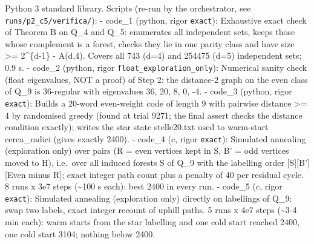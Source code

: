 Python 3 standard library. Scripts (re-run by the orchestrator, see
\texttt{runs/p2\_c5/verifica/}): - code\_1 (python, rigor
\texttt{exact}): Exhaustive exact check of Theorem B on Q\_4 and Q\_5:
enumerates all independent sets, keeps those whose complement is a
forest, checks they lie in one parity class and have size \textgreater=
2\^{}\{d-1\} - A(d,4). Covers all 743 (d=4) and 254475 (d=5) independent
sets; 0.9 s. - code\_2 (python, rigor
\texttt{float\_exploration\_only}): Numerical sanity check (float
eigenvalues, NOT a proof) of Step 2: the distance-2 graph on the even
class of Q\_9 is 36-regular with eigenvalues 36, 20, 8, 0, -4. - code\_3
(python, rigor \texttt{exact}): Builds a 20-word even-weight code of
length 9 with pairwise distance \textgreater= 4 by randomised greedy
(found at trial 9271; the final assert checks the distance condition
exactly); writes the star state stelle20.txt used to warm-start
cerca\_radici (gives exactly 2400). - code\_4 (c, rigor \texttt{exact}):
Simulated annealing (exploration only) over pairs (R = even vertices
kept in S, B' = odd vertices moved to H), i.e.~over all induced forests
S of Q\_9 with the labelling order {[}S{]}{[}B'{]}{[}Even minus R{]};
exact integer path count plus a penalty of 40 per residual cycle. 8 runs
x 3e7 steps (\textasciitilde100 s each): best 2400 in every run. -
code\_5 (c, rigor \texttt{exact}): Simulated annealing (exploration
only) directly on labellings of Q\_9: swap two labels, exact integer
recount of uphill paths. 5 runs x 4e7 steps (\textasciitilde3-4 min
each): warm starts from the star labelling and one cold start reached
2400, one cold start 3104; nothing below 2400.


